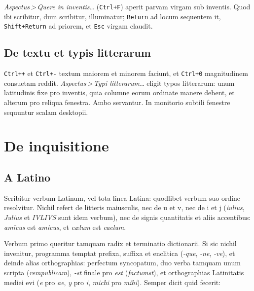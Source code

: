 \documentclass[12pt,
              article,
              oneside
              ]{memoir}
\newcommand*{\menu}[1]{\textit{#1}}
\newcommand*{\then}{\,>\,}
\newcommand*{\key}[1]{\texttt{#1}}
\begin{document}
%
\menu{Aspectus\then Quere in inventis\ldots} (\key{Ctrl+F}) aperit parvam
virgam sub inventis. Quod ibi scribitur, dum scribitur, illuminatur;
\key{Return} ad locum sequentem it, \key{Shift+Return} ad priorem, et
\key{Esc} virgam claudit.

\subsection{De textu et typis litterarum}

%
\key{Ctrl++} et \key{Ctrl+-} textum maiorem et minorem faciunt, et
\key{Ctrl+0} magnitudinem consuetam reddit. \menu{Aspectus\then Typi litterarum\ldots}
eligit typos litterarum: unum latitudinis fixe pro inventis, quia
columne eorum ordinate manere debent, et alterum pro reliqua fenestra.
Ambo servantur. In monitorio subtili fenestre sequuntur scalam
desktopii.

\section{De inquisitione}
\label{sec:searching}

\subsection{A Latino}

%
Scribitur verbum Latinum, vel tota linea Latina: quodlibet verbum suo
ordine resolvitur. Nichil refert de litteris maiusculis, nec de u et v,
nec de i et j (\textit{iulius}, \textit{Julius} et \textit{IVLIVS} sunt
idem verbum), nec de signis quantitatis et aliis accentibus:
\textit{amīcus} est \textit{amicus}, et \textit{cælum} est
\textit{caelum}.

%
Verbum primo queritur tamquam radix et terminatio dictionarii. Si sic
nichil invenitur, programma temptat prefixa, suffixa et enclitica
(\textit{-que}, \textit{-ne}, \textit{-ve}), et deinde alias
orthographias: perfectum syncopatum, duo verba tamquam unum scripta
(\textit{rempublicam}), \textit{-st} finale pro \textit{est}
(\textit{factumst}), et orthographias Latinitatis mediei evi (\textit{e}
pro \textit{ae}, \textit{y} pro \textit{i}, \textit{michi} pro
\textit{mihi}). Semper dicit quid fecerit:
\end{document}
